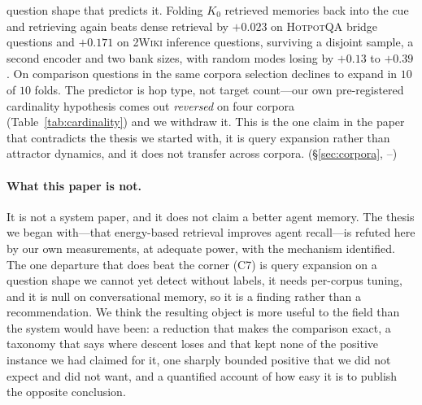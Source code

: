 \begin{itemize}
{    question shape that predicts it.} Folding $K_0$ retrieved memories back into the cue and
    retrieving again beats dense retrieval by $+0.023$  on
    \textsc{HotpotQA} bridge questions and $+0.171$  on \textsc{2Wiki}
    inference questions, surviving a disjoint sample, a second encoder and two bank sizes,
    with random modes losing by $+0.13$ to $+0.39$. On comparison questions in the same
    corpora selection declines to expand in $10$ of $10$ folds. The predictor is hop type,
    not target count---our own pre-registered cardinality hypothesis comes out
    \emph{reversed} on four corpora (Table~\ref{tab:cardinality}) and we withdraw it. This
    is the one claim in the paper that contradicts the thesis we started with, it is query
    expansion rather than attractor dynamics, and it does not transfer across corpora.
    (\S\ref{sec:corpora}, --)
\end{itemize}

\paragraph{What this paper is not.} It is not a system paper, and it does not claim a better
agent memory. The thesis we began with---that energy-based retrieval improves agent
recall---is refuted here by our own measurements, at adequate power, with the mechanism
identified. The one departure that does beat the corner (C7) is query expansion on a
question shape we cannot yet detect without labels, it needs per-corpus tuning, and it is
null on conversational memory, so it is a finding rather than a recommendation. We think the
resulting object is more useful to the field than the system would have been: a reduction
that makes the comparison exact, a taxonomy that says where descent loses and that kept none
of the positive instance we had claimed for it, one sharply bounded positive that we did not
expect and did not want, and a quantified account of how easy it is to publish the opposite
conclusion.

